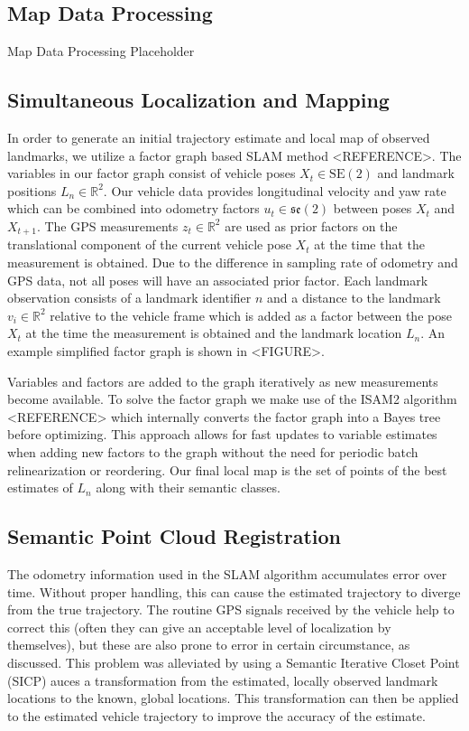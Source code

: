\documentclass[letterpaper, 10 pt, conference]{ieeeconf}  %
\begin{document}
\subsection{Map Data Processing}

Map Data Processing Placeholder

\subsection{Simultaneous Localization and Mapping}

In order to generate an initial trajectory estimate and local map of observed landmarks, we utilize a factor graph based SLAM method <REFERENCE>.
The variables in our factor graph consist of vehicle poses $X_t \in \mathrm{SE}(2)$ and landmark positions $L_n \in \mathbb{R}^2$.
Our vehicle data provides longitudinal velocity and yaw rate which can be combined into odometry factors $u_t \in \mathfrak{se}(2)$ between poses $X_t$ and $X_{t+1}$.
The GPS measurements $z_t \in \mathbb{R}^2$ are used as prior factors on the translational component of the current vehicle pose $X_t$ at the time that the measurement is obtained. Due to the difference in sampling rate of odometry and GPS data, not all poses will have an associated prior factor.
Each landmark observation consists of a landmark identifier $n$ and a distance to the landmark $v_i \in \mathbb{R}^2$ relative to the vehicle frame which is added as a factor between the pose $X_t$ at the time the measurement is obtained and the landmark location $L_n$.
An example simplified factor graph is shown in <FIGURE>.

Variables and factors are added to the graph iteratively as new measurements become available.
To solve the factor graph we make use of the ISAM2 algorithm <REFERENCE> which internally converts the factor graph into a Bayes tree before optimizing. This approach allows for fast updates to variable estimates when adding new factors to the graph without the need for periodic batch relinearization or reordering.
Our final local map is the set of points of the best estimates of $L_n$ along with their semantic classes.

\subsection{Semantic Point Cloud Registration}
The odometry information used in the SLAM algorithm accumulates error over time. Without proper handling, this can cause the estimated trajectory to diverge from the true trajectory. The routine GPS signals received by the vehicle help to correct this (often they can give an acceptable level of localization by themselves), but these are also prone to error in certain circumstance, as discussed. This problem was alleviated by using a Semantic Iterative Closet Point (SICP) auces a transformation from the estimated, locally observed landmark locations to the known, global locations. This transformation can then be applied to the estimated vehicle trajectory to improve the accuracy of the estimate. 
\end{document}
